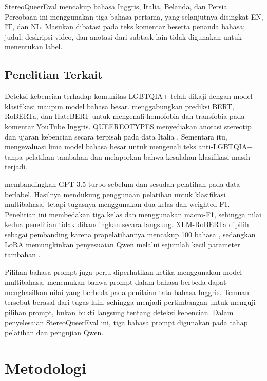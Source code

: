 \documentclass[11pt]{article}
\begin{document}
StereoQueerEval mencakup bahasa Inggris, Italia, Belanda, dan Persia. Percobaan ini menggunakan tiga bahasa pertama, yang selanjutnya disingkat EN, IT, dan NL. Masukan dibatasi pada teks komentar beserta penanda bahasa; judul, deskripsi video, dan anotasi dari subtask lain tidak digunakan untuk menentukan label.

\subsection{Penelitian Terkait}
Deteksi kebencian terhadap komunitas LGBTQIA+ telah dikaji dengan model klasifikasi maupun model bahasa besar. \citet{nozza-2022-nozza} menggabungkan prediksi BERT, RoBERTa, dan HateBERT untuk mengenali homofobia dan transfobia pada komentar YouTube Inggris. QUEEREOTYPES menyediakan anotasi stereotip dan ujaran kebencian secara terpisah pada data Italia \citep{cignarella-etal-2024-queereotypes}. Sementara itu, \citet{nguyen-etal-2025-leveraging} mengevaluasi lima model bahasa besar untuk mengenali teks anti-LGBTQIA+ tanpa pelatihan tambahan dan melaporkan bahwa kesalahan klasifikasi masih terjadi.

\citet{chan-etal-2024-hate} membandingkan GPT-3.5-turbo sebelum dan sesudah pelatihan pada data berlabel. Hasilnya mendukung penggunaan pelatihan untuk klasifikasi multibahasa, tetapi tugasnya menggunakan dua kelas dan weighted-F1. Penelitian ini membedakan tiga kelas dan menggunakan macro-F1, sehingga nilai kedua penelitian tidak dibandingkan secara langsung. XLM-RoBERTa dipilih sebagai pembanding karena prapelatihannya mencakup 100 bahasa \citep{conneau-etal-2020-unsupervised}, sedangkan LoRA memungkinkan penyesuaian Qwen melalui sejumlah kecil parameter tambahan \citep{hu-etal-2021-lora}.

Pilihan bahasa prompt juga perlu diperhatikan ketika menggunakan model multibahasa. \citet{behzad-etal-2024-ask} menemukan bahwa prompt dalam bahasa berbeda dapat menghasilkan nilai yang berbeda pada penilaian tata bahasa Inggris. Temuan tersebut berasal dari tugas lain, sehingga menjadi pertimbangan untuk menguji pilihan prompt, bukan bukti langsung tentang deteksi kebencian. Dalam penyelesaian StereoQueerEval ini, tiga bahasa prompt digunakan pada tahap pelatihan dan pengujian Qwen.

\section{Metodologi}
\end{document}

